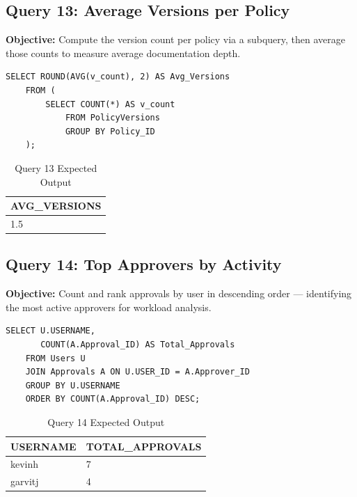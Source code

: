 \documentclass[conference]{IEEEtran}
\begin{document}
\subsection{Query 13: Average Versions per Policy}

\textbf{Objective:} Compute the version count per policy via a subquery, then average those counts to measure average documentation depth.

\begin{lstlisting}[style=sqlstyle, caption={Query 13: Avg Versions (AVG + Subquery)}]
SELECT ROUND(AVG(v_count), 2) AS Avg_Versions
    FROM (
        SELECT COUNT(*) AS v_count
            FROM PolicyVersions
            GROUP BY Policy_ID
    );
\end{lstlisting}

\begin{table}[H]
\centering
\caption{Query 13 Expected Output}
\begin{tabular}{|l|}
\hline
\textbf{AVG\_VERSIONS} \\
\hline
1.5 \\
\hline
\end{tabular}
\end{table}

\subsection{Query 14: Top Approvers by Activity}

\textbf{Objective:} Count and rank approvals by user in descending order — identifying the most active approvers for workload analysis.

\begin{lstlisting}[style=sqlstyle, caption={Query 14: Top Approvers (GROUP BY + ORDER BY)}]
SELECT U.USERNAME,
       COUNT(A.Approval_ID) AS Total_Approvals
    FROM Users U
    JOIN Approvals A ON U.USER_ID = A.Approver_ID
    GROUP BY U.USERNAME
    ORDER BY COUNT(A.Approval_ID) DESC;
\end{lstlisting}

\begin{table}[H]
\centering
\caption{Query 14 Expected Output}
\begin{tabular}{|l|l|}
\hline
\textbf{USERNAME} & \textbf{TOTAL\_APPROVALS} \\
\hline
kevinh  & 7 \\
garvitj & 4 \\
\hline
\end{tabular}
\end{table}
\end{document}
